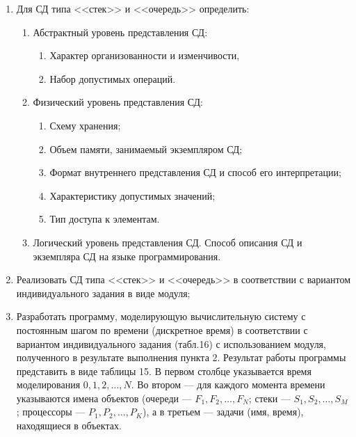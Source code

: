 \documentclass[12pt]{article}
\begin{document}
	\begin{enumerate}
	
	\item Для СД типа  <<стек>> и <<очередь>> определить:
	
		\begin{enumerate}
	
			\item Абстрактный уровень представления СД:
			
			\begin{enumerate}
	
				\item Характер организованности и изменчивости, 
	
				\item Набор допустимых операций.
			
			\end{enumerate}
	
	
			\item Физический уровень представления СД:
			
			\begin{enumerate}
	
				\item Схему хранения;
	
				\item Объем памяти, занимаемый экземпляром СД;
	
				\item Формат внутреннего представления СД и способ его  интерпретации;
				
				\item Характеристику допустимых значений;
				
				\item Тип доступа к элементам.
				
			\end{enumerate}
			
			\item Логический уровень представления СД. Способ описания СД и экземпляра СД на языке программирования.
	
		\end{enumerate}
	
	\item Реализовать СД типа <<стек>> и <<очередь>> в соответствии с вариантом индивидуального задания в виде модуля;
	
	\item Разработать  программу,  моделирующую  вычислительную  систему с постоянным шагом по времени (дискретное время) в соответствии с вариантом индивидуального задания (табл.16) с использованием модуля, полученного в результате выполнения пункта 2. Результат работы программы представить в виде таблицы 15. В первом столбце указывается время моделирования $0, 1, 2, …, N$. Во втором — для каждого момента времени указываются имена объектов (очереди — $F_1, F_2, …, F_N$; стеки — $S_1, S_2, …, S_M$; процессоры — $P_1, P_2, …, P_K$), а в третьем — задачи (имя, время), находящиеся в объектах.
	
	\end{enumerate}
	
\end{document}
